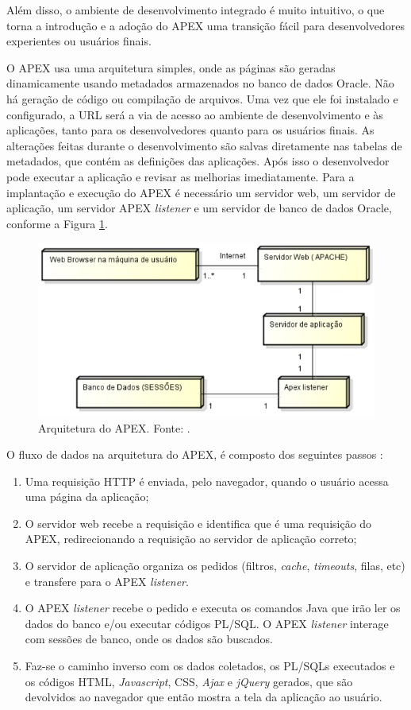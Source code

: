 Além disso, o ambiente de desenvolvimento integrado é muito intuitivo, o que torna a introdução e a adoção do APEX uma transição fácil para desenvolvedores experientes ou usuários finais.

O APEX usa uma arquitetura simples, onde as páginas são geradas dinamicamente usando metadados armazenados no banco de dados Oracle. Não há geração de código ou compilação de arquivos. Uma vez que ele foi instalado e configurado, a URL será a via de acesso ao ambiente de desenvolvimento e às aplicações, tanto para os desenvolvedores quanto para os usuários finais. As alterações feitas durante o desenvolvimento são salvas diretamente nas tabelas de metadados, que contém as definições das aplicações. Após isso o desenvolvedor pode executar a aplicação e revisar as melhorias imediatamente.
Para a implantação e execução do APEX é necessário um servidor web, um servidor de aplicação, um servidor APEX \textit{listener} e um servidor de banco de dados Oracle, conforme a Figura \ref{arquitetura_apex}.
\clearpage

\begin{figure}[!htb]
	\centering
	\includegraphics[scale=0.6]{figuras/arquitetura_apex}
	\caption{Arquitetura do APEX. Fonte: \cite{ferreira2015}.}
	\label{arquitetura_apex}
\end{figure}

O fluxo de dados na arquitetura do APEX, é composto dos seguintes passos \cite{ferreira2015}:
\begin{enumerate}
	\item Uma requisição HTTP é enviada, pelo navegador, quando o usuário acessa uma página da aplicação;
	\item O servidor web recebe a requisição e identifica que é uma requisição do APEX, redirecionando a requisição ao servidor de aplicação correto;
	\item O servidor de aplicação organiza os pedidos (filtros, \textit{cache}, \textit{timeouts}, filas, etc) e transfere para o APEX \textit{listener}.
	\item O APEX \textit{listener} recebe o pedido e executa os comandos Java que irão ler os dados do banco e/ou executar códigos PL/SQL. O APEX \textit{listener} interage com sessões de banco, onde os dados são buscados.
	\item Faz-se o caminho inverso com os dados coletados, os PL/SQLs executados e os códigos HTML, \textit{Javascript}, CSS, \textit{Ajax} e \textit{jQuery} gerados, que são devolvidos ao navegador que então mostra a tela da aplicação ao usuário.
\end{enumerate}

